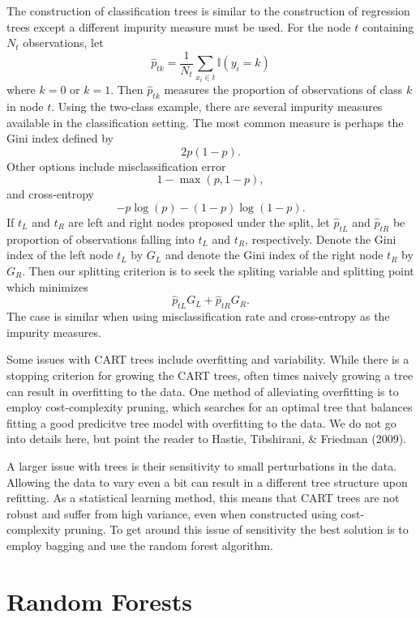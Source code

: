 \documentclass[12pt,twoside]{reedthesis}
\theoremstyle{definition}
\theoremstyle{definition}
\theoremstyle{definition}
\theoremstyle{remark}
\begin{document}
The construction of classification trees is similar to the construction
of regression trees except a different impurity measure must be used.
For the node \(t\) containing \(N_t\) observations, let
\[\hat{p}_{tk}=\frac{1}{N_t}\sum_{x_i\in t} \mathbb{I}(y_i=k)\] where
\(k=0\) or \(k=1\). Then \(\hat{p}_{tk}\) measures the proportion of
observations of class \(k\) in node \(t\). Using the two-class example,
there are several impurity measures available in the classification
setting. The most common measure is perhaps the Gini index defined by
\[2p(1-p).\] Other options include misclassification error
\[1-\max(p,1-p),\] and cross-entropy \[-p\log(p)-(1-p)\log(1-p).\] If
\(t_L\) and \(t_R\) are left and right nodes proposed under the split,
let \(\hat{p}_{tL}\) and \(\hat{p}_{tR}\) be proportion of observations
falling into \(t_L\) and \(t_R\), respectively. Denote the Gini index of
the left node \(t_L\) by \(G_{L}\) and denote the Gini index of the
right node \(t_R\) by \(G_{R}\). Then our splitting criterion is to seek
the spliting variable and splitting point which minimizes
\[\hat{p}_{tL}G_L+\hat{p}_{tR}G_R.\] The case is similar when using
misclassification rate and cross-entropy as the impurity measures. \par

Some issues with CART trees include overfitting and variability. While
there is a stopping criterion for growing the CART trees, often times
naively growing a tree can result in overfitting to the data. One method
of alleviating overfitting is to employ cost-complexity pruning, which
searches for an optimal tree that balances fitting a good predicitve
tree model with overfitting to the data. We do not go into details here,
but point the reader to Hastie, Tibshirani, \& Friedman (2009). \par

A larger issue with trees is their sensitivity to small perturbations in
the data. Allowing the data to vary even a bit can result in a different
tree structure upon refitting. As a statistical learning method, this
means that CART trees are not robust and suffer from high variance, even
when constructed using cost-complexity pruning. To get around this issue
of sensitivity the best solution is to employ bagging and use the random
forest algorithm. \par

\section{Random Forests}\label{random-forests}
\end{document}
